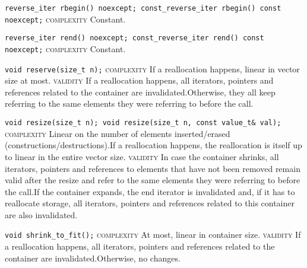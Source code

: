 \noindent{}\hspace*{0.25em}\lstinline[basicstyle=\ttfamily\color{cgreen}]{reverse_iter rbegin() noexcept; const_reverse_iter rbegin() const noexcept;} \textsc{complexity} Constant.\\\vspace{-0.6em}

\noindent{}\hspace*{0.25em}\lstinline[basicstyle=\ttfamily\color{cgreen}]{reverse_iter rend() noexcept; const_reverse_iter rend() const noexcept;} \textsc{complexity} Constant.\\\vspace{-0.6em}

\noindent{}\hspace*{0.25em}\lstinline[basicstyle=\ttfamily\color{corange}]{void reserve(size_t n);} \textsc{complexity} If a reallocation happens, linear in vector size at most. \textsc{validity} If a reallocation happens, all iterators, pointers and references related to the container are invalidated.Otherwise, they all keep referring to the same elements they were referring to before the call.\\\vspace{-0.6em}

\noindent{}\hspace*{0.25em}\lstinline[basicstyle=\ttfamily\color{corange}]{void resize(size_t n); void resize(size_t n, const value_t& val);} \textsc{complexity} Linear on the number of elements inserted/erased (constructions/destructions).If a reallocation happens, the reallocation is itself up to linear in the entire vector size. \textsc{validity} In case the container shrinks, all iterators, pointers and references to elements that have not been removed remain valid after the resize and refer to the same elements they were referring to before the call.If the container expands, the end iterator is invalidated and, if it has to reallocate storage, all iterators, pointers and references related to this container are also invalidated.\\\vspace{-0.6em}

\noindent{}\hspace*{0.25em}\lstinline[basicstyle=\ttfamily\color{corange}]{void shrink_to_fit();} \textsc{complexity} At most, linear in container size. \textsc{validity} If a reallocation happens, all iterators, pointers and references related to the container are invalidated.Otherwise, no changes.\\\vspace{-0.6em}

